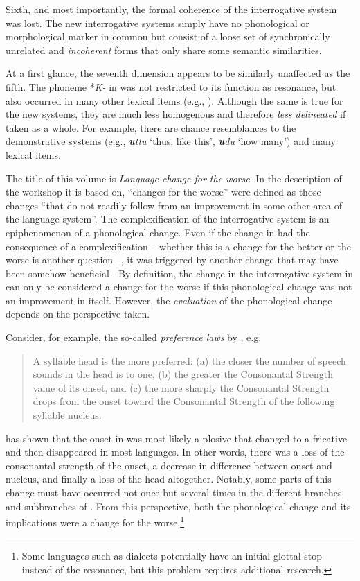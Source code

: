 \documentclass[output=paper,hidelinks]{langscibook}
\begin{document}
Sixth, and most importantly, the formal coherence of the interrogative system was lost. The new interrogative systems simply have no phonological or morphological marker in common but consist of a loose set of synchronically unrelated and \textit{incoherent} forms that only share some semantic similarities.

At a first glance, the seventh dimension appears to be similarly unaffected as the fifth. The phoneme *\textit{K-} in  was not restricted to its function as resonance, but also occurred in many other lexical items (e.g., \citealt[227--250]{Ikegami1997}). Although the same is true for the new systems, they are much less homogenous and therefore \textit{less delineated} if taken as a whole. For example, there are chance resemblances to the demonstrative systems (e.g.,  \textit{\textbf{u}ttu} `thus, like this', \textit{\textbf{u}du} `how many') and many lexical items.

The title of this volume is \textit{Language change for the worse}. In the description of the workshop it is based on, ``changes for the worse'' were defined as those changes ``that do not readily follow from an improvement in some other area of the language system''. The complexification of the  interrogative system is an epiphenomenon of a phonological change. Even if the change in  had the consequence of a complexification -- whether this is a change for the better or the worse is another question --, it was triggered by another change that may have been somehow beneficial \citep[195]{Dixon2016}. By definition, the change in the interrogative system in  can only be considered a change for the worse if this phonological change was not an improvement in itself. However, the \textit{evaluation} of the phonological change depends on the perspective taken.

\newpage
Consider, for example, the so-called \textit{preference laws} by \citet{Vennemann1988}, e.g.

\begin{quote}
A syllable head is the more preferred: (a) the closer the number of speech sounds in the head is to one, (b) the greater the Consonantal Strength value of its onset, and (c) the more sharply the Consonantal
Strength drops from the onset toward the Consonantal Strength of the following syllable nucleus. \citep[13f.]{Vennemann1988}
\end{quote}

\noindent {} has shown that the onset in  was most likely a plosive that changed to a fricative and then disappeared in most languages. In other words, there was a loss of the consonantal strength of the onset, a decrease in difference between onset and nucleus, and finally a loss of the head altogether. Notably, some parts of this change must have occurred not once but several times in the different branches and subbranches of . From this perspective, both the phonological change and its implications were a change for the worse.\footnote{Some languages such as  dialects potentially have an initial glottal stop instead of the resonance, but this problem requires additional research.}
\end{document}
